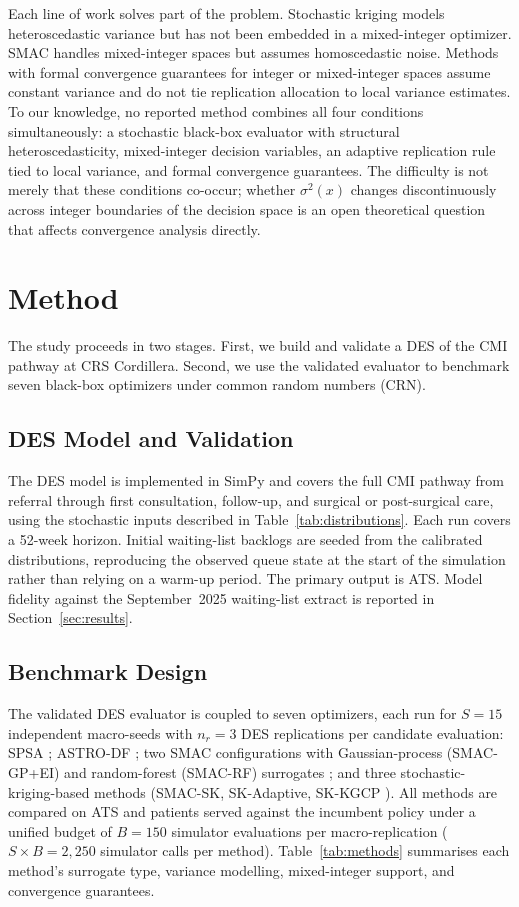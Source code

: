 \documentclass[11pt]{elsarticle}
\begin{document}
Each line of work solves part of the problem. Stochastic kriging models heteroscedastic variance but has not been embedded in a mixed-integer optimizer. SMAC handles mixed-integer spaces but assumes homoscedastic noise. Methods with formal convergence guarantees for integer or mixed-integer spaces assume constant variance and do not tie replication allocation to local variance estimates. To our knowledge, no reported method combines all four conditions simultaneously: a stochastic black-box evaluator with structural heteroscedasticity, mixed-integer decision variables, an adaptive replication rule tied to local variance, and formal convergence guarantees. The difficulty is not merely that these conditions co-occur; whether $\sigma^2(x)$ changes discontinuously across integer boundaries of the decision space is an open theoretical question that affects convergence analysis directly.


\section{Method}
\label{sec:method}

The study proceeds in two stages. First, we build and validate a DES of the CMI pathway at CRS Cordillera. Second, we use the validated evaluator to benchmark seven black-box optimizers under common random numbers (CRN).

\subsection{DES Model and Validation}

The DES model is implemented in SimPy and covers the full CMI pathway from referral through first consultation, follow-up, and surgical or post-surgical care, using the stochastic inputs described in Table~\ref{tab:distributions}. Each run covers a 52-week horizon. Initial waiting-list backlogs are seeded from the calibrated distributions, reproducing the observed queue state at the start of the simulation rather than relying on a warm-up period. The primary output is ATS. Model fidelity against the September~2025 waiting-list extract is reported in Section~\ref{sec:results}.

\subsection{Benchmark Design}

The validated DES evaluator is coupled to seven optimizers, each run for $S = 15$ independent macro-seeds with $n_r = 3$ DES replications per candidate evaluation: SPSA \citep{Spall1992}; ASTRO-DF \citep{Shashaani2018}; two SMAC configurations with Gaussian-process (SMAC-GP+EI) and random-forest (SMAC-RF) surrogates \citep{Lindauer2022}; and three stochastic-kriging-based methods (SMAC-SK, SK-Adaptive, SK-KGCP \citep{Scott2011}). All methods are compared on ATS and patients served against the incumbent policy under a unified budget of $B = 150$ simulator evaluations per macro-replication ($S \times B = 2{,}250$ simulator calls per method). Table~\ref{tab:methods} summarises each method's surrogate type, variance modelling, mixed-integer support, and convergence guarantees.
\end{document}

